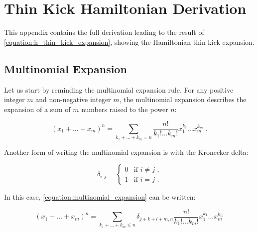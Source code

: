\addappheadtotoc                                 %
\noappendicestocpagenum                          %

\chapter{Thin Kick Hamiltonian Derivation}
\label{appendix:hamiltonian_derivation}

This appendix contains the full derivation leading to the result of \cref{equation:h_thin_kick_expansion}, showing the Hamiltonian thin kick expansion.

\section{Multinomial Expansion}
\label{section:multinomial_expansion}

Let us start by reminding the multinomial expansion rule.
For any positive integer \(m\) and non-negative integer \(m\), the multinomial expansion describes the expansion of a sum of \(m\) numbers raised to the power \(n\):

\begin{equation}
    (x_1 + \ldots + x_m)^n = \sum_{k_1 + \ldots + k_m = n} \frac{n!}{k_1! \ldots k_m!} x_1^{k_1} \ldots x_m^{k_m} \text{ .}
    \label{equation:multinomial_expansion}
\end{equation}

Another form of writing the multinomial expansion is with the Kronecker delta:

\begin{equation}
    \delta_{i,j} = 
        \begin{cases} 
            0 & \text{if } i \neq j \text{ ,} \\
            1 & \text{if } i = j \text{ .}
        \end{cases}
    \label{equation:kronecker_delta}
\end{equation}

In this case, \cref{equation:multinomial_expansion} can be written:

\begin{equation}
    (x_1 + \ldots + x_m)^n = \sum_{k_1 + \ldots + k_m \leq n} \delta_{j + k + l + m, n} \frac{n!}{k_1! \ldots k_m!} x_1^{k_1} \ldots x_m^{k_m}
    \label{equation:multinomial_expansion_kronecker}
\end{equation}

